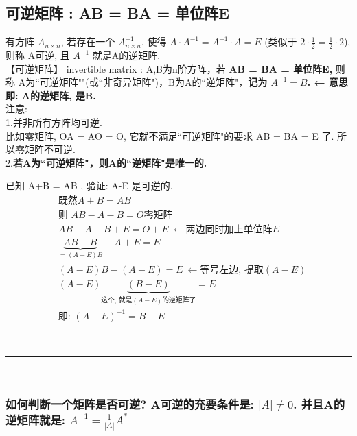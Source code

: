\documentclass[UTF8]{ctexart}
\begin{document}
\subsection{可逆矩阵 : AB = BA = 单位阵E}


有方阵  $ A_{n \times n}$, 若存在一个 $ A_{n \times n}^{-1}$, 使得  $ A \cdot A^{-1} = A^{-1} \cdot A = E$ (类似于 $ 2 \cdot \frac{1}{2} =  \frac{1}{2} \cdot 2 $), 则称 A可逆, 且 $A^{-1} $ 就是A的逆矩阵. \\


【可逆矩阵】 invertible matrix : A,B为n阶方阵，若 \textbf{AB = BA = 单位阵E,} 则称 A为``可逆矩阵""(或``非奇异矩阵")，B为A的``逆矩阵"，\textbf{记为 $A^{-1}=B$. ← 意思即: A的逆矩阵, 是B.} \\ 

注意: \\
1.并非所有方阵均可逆. \\
比如零矩阵, OA = AO = O, 它就不满足``可逆矩阵"的要求 AB = BA = E 了. 所以零矩阵不可逆.\\

2.\textbf{若A为``可逆矩阵"，则A的``逆矩阵"是唯一的.}\\




\begin{myEnvSample}
	已知 A+B = AB , 验证:  A-E 是可逆的. 
	\begin{align*}
	& \text{既然}A+B=AB\\
& \text{则\ }AB-A-B=O\text{零矩阵}\\
& AB-A-B+E=O+E\ ←\text{两边同时加上单位阵}E\\
& \underset{=(A-E)B}{\underbrace{AB-B}}-A+E=E\\
& (A-E)B-\left( A-E \right) =E\ ←\text{等号左边,\ 提取}\left( A-E \right)\\
& \left( A-E \right) \underset{\text{这个,\ 就是}\left( A-E \right) \text{的逆矩阵了}}{\underbrace{\left( B-E \right) }}=E\\
& \text{即:\ }\left( A-E \right) ^{-1}=B-E
\end{align*}
\end{myEnvSample}



~\\
\hrule
~\\

\subsubsection{如何判断一个矩阵是否可逆? A可逆的充要条件是: $|A| \ne 0$. 并且A的逆矩阵就是: $	A^{-1}=\frac{1}{|A|}A^*	$}
\end{document}
